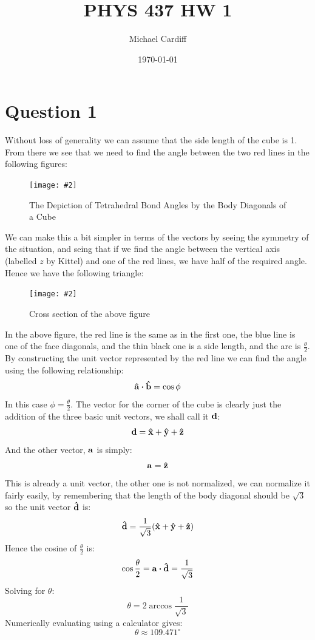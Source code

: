 \documentclass[12pt]{article}
\title{PHYS 437 HW 1}
\author{Michael Cardiff}
\date{\today}
\newcommand{\fig}[3]{
  \begin{figure}[H]
    \centering\texttt{[image: \#2]}\caption{#3}
  \end{figure}}
\begin{document}
\maketitle
\section*{Question 1}
Without loss of generality we can assume that the side length of the cube is 1. From there we see that we need to find the angle between the two red lines in the following figures:
\fig{8.0}{tetrahedral.png}{The Depiction of Tetrahedral Bond Angles by the Body Diagonals of a Cube}
We can make this a bit simpler in terms of the vectors by seeing the symmetry of the situation, and seing that if we find the angle between the vertical axis (labelled $z$ by Kittel) and one of the red lines, we have half of the required angle. Hence we have the following triangle:
\fig{5.0}{triangle1.png}{Cross section of the above figure}
In the above figure, the red line is the same as in the first one, the blue line is one of the face diagonals, and the thin black one is a side length, and the arc is $\frac{\theta}{2}$. By constructing the unit vector represented by the red line we can find the angle using the following relationship:
\begin{equation*}
  \vb{\hat{a}}\vdot\vb{\hat{b}}=\cos\phi
\end{equation*}
In this case $\phi=\frac{\theta}{2}$. The vector for the corner of the cube is clearly just the addition of the three basic unit vectors, we shall call it $\vb{d}$:
\begin{equation*}
  \vb{d}=\vb{\hat{x}+\hat{y}+\hat{z}}
\end{equation*}
And the other vector, $\vb{a}$ is simply:
\begin{equation*}
  \vb{a}=\vb{\hat{z}}
\end{equation*}
This is already a unit vector, the other one is not normalized, we can normalize it fairly easily, by remembering that the length of the body diagonal should be $\sqrt{3}$ so the unit vector $\vb{\hat{d}}$ is:
\begin{equation*}
  \vb{\hat{d}}=\frac{1}{\sqrt{3}}\qty(\vb{\hat{x}+\hat{y}+\hat{z}})
\end{equation*}
Hence the cosine of $\frac{\theta}{2}$ is:
\begin{equation*}
  \cos\frac{\theta}{2}=\vb{a}\vdot\vb{\hat{d}}=\frac{1}{\sqrt{3}}
\end{equation*}
Solving for $\theta$:
\begin{equation*}
  \theta=2\arccos\frac{1}{\sqrt{3}}
\end{equation*}
Numerically evaluating using a calculator gives:
\begin{equation*}
  \boxed{\theta\approx109.471^\circ}
\end{equation*}
\end{document}
